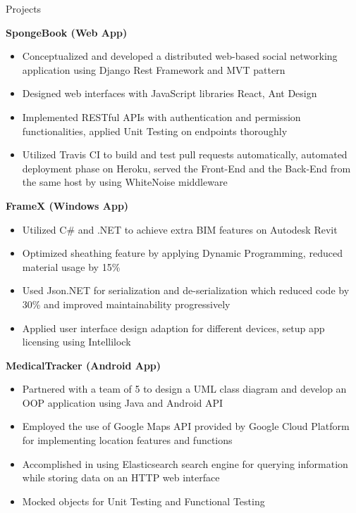 \documentclass{resume} %
\begin{document}
\begin{rSection}{Projects}

{\bf SpongeBook (Web App)}
\begin{itemize}
\item Conceptualized and developed a distributed web-based social networking application using Django Rest Framework and MVT pattern
\item Designed web interfaces with JavaScript libraries React, Ant Design
\item Implemented RESTful APIs with authentication and permission functionalities, applied Unit Testing on endpoints thoroughly
\item Utilized Travis CI to build and test pull requests automatically, automated deployment phase on Heroku, served the Front-End and the Back-End from the same host by using WhiteNoise middleware
\end{itemize}

{\bf FrameX  (Windows App)}
\begin{itemize}
\item Utilized C\# and .NET to achieve extra BIM features on Autodesk Revit
\item Optimized sheathing feature by applying Dynamic Programming, reduced material usage by 15\%
\item  Used Json.NET for serialization and de-serialization which reduced code by 30\% and improved maintainability progressively
\item Applied user interface design adaption for different devices, setup app licensing using Intellilock
\end{itemize}

{\bf MedicalTracker (Android  App)}
\begin{itemize}
\item Partnered with a team of 5 to design a UML class diagram and develop an OOP application using Java and Android API
\item Employed the use of Google Maps API provided by Google Cloud Platform for implementing location features and functions
\item Accomplished in using Elasticsearch search engine for querying information while storing data on an HTTP web interface
\item Mocked objects for Unit Testing and Functional Testing
\end{itemize}
\end{rSection}
\end{document}

